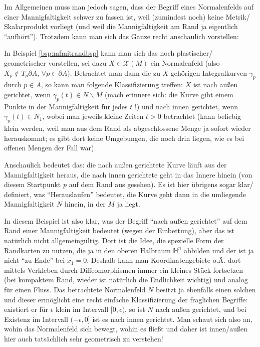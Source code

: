 \documentclass[../H_Analysis_main.tex]{subfiles}
\begin{document}
Im Allgemeinen muss man jedoch sagen, dass der Begriff eines Normalenfelds auf einer Mannigfaltigkeit schwer zu fassen ist, weil (zumindest noch) keine Metrik/ Skalarprodukt vorliegt (und weil die Mannigfaltigkeit am Rand ja eigentlich \enquote{aufhört}). Trotzdem kann man sich das Ganze recht anschaulich vorstellen:

\begin{bsp}
In Beispiel \ref{bsp:mfmitrandbsp} kann man sich das noch plastischer/ geometrischer vorstellen, sei dazu $X \in \mathcal{X}(M)$ ein Normalenfeld (also $X_p \notin T_p \partial A, \, \forall p \in \partial A$). Betrachtet man dann die zu $X$ gehörigen Integralkurven $\gamma_p$ durch $p \in A$, so kann man folgende Klassifizierung treffen: $X$ ist nach außen gerichtet, wenn $\gamma_p(t) \in N \backslash M$ (mach erinnere sich: die Kurve gibt einem Punkte in der Mannigfaltigkeit für jedes $t$ !) und nach innen gerichtet, wenn $\gamma_p(t) \in N_1$, wobei man jeweils kleine Zeiten $t > 0$ betrachtet (kann beliebig klein werden, weil man aus dem Rand als abgeschlossene Menge ja sofort wieder herauskommt; es gibt dort keine Umgebungen, die noch drin liegen, wie es bei offenen Mengen der Fall war).

Anschaulich bedeutet das: die nach außen gerichtete Kurve läuft aus der Mannigfaltigkeit heraus, die nach innen gerichtete geht in das Innere hinein (von diesem Startpunkt $p$ auf dem Rand aus gesehen). Es ist hier übrigens sogar klar/ definiert, was \enquote{Herauslaufen} bedeutet, die Kurve geht dann in die umliegende Mannigfaltigkeit $N$ hinein, in der $M$ ja liegt.
\end{bsp}

In diesem Beispiel ist also klar, was der Begriff \enquote{nach außen gerichtet} auf dem Rand einer Mannigfaltigkeit bedeutet (wegen der Einbettung), aber das ist natürlich nicht allgemeingültig. Dort ist die Idee, die spezielle Form der Randkarten zu nutzen, die ja in den oberen Halbraum $\mathbb{H}^n$ abbilden und der ist ja nicht \enquote{zu Ende} bei $x_1 = 0$. Deshalb kann man Koordinatengebiete o.Ä. dort mittels Verkleben durch Diffeomorphismen immer ein kleines Stück fortsetzen (bei kompaktem Rand, wieder ist natürlich die Endlichkeit wichtig) und analog für einen Fluss. Das betrachtete Normalenfeld $N$ besitzt ja ebenfalls einen solchen und dieser ermöglicht eine recht einfache Klassifizierung der fraglichen Begriffe: existiert er für $\epsilon$ klein im Intervall $[0, \epsilon)$, so ist $N$ nach außen gerichtet, und bei Existenz im Intervall $(-\epsilon, 0]$ ist es nach innen gerichtet. Man schaut sich also an, wohin das Normalenfeld sich bewegt, wohin es fließt und daher ist innen/außen hier auch tatsächlich sehr geometrisch zu verstehen!
\end{document}
